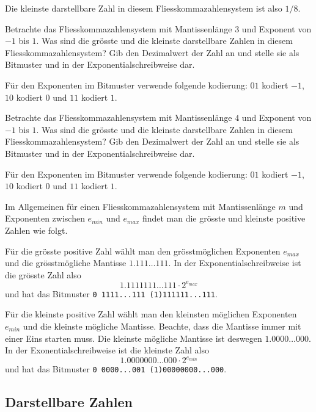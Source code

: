 \begin{beispiel}
Die kleinste darstellbare Zahl in diesem Fliesskommazahlensystem ist also \(1/8\).
\end{beispiel}

\begin{aufgabe}\label{groesste_klein}
Betrachte das Fliesskommazahlensystem mit Mantissenlänge \(3\) und Exponent von \(-1\) bis \(1\). Was sind die grösste und die kleinste darstellbare Zahlen in diesem Fliesskommazahlensystem? Gib den Dezimalwert der Zahl an und stelle sie als Bitmuster und in der Exponentialschreibweise dar.

Für den Exponenten im Bitmuster verwende folgende kodierung: \(01\) kodiert \(-1\), \(10\) kodiert \(0\) und \(11\) kodiert \(1\).
\end{aufgabe}

\begin{aufgabe}
Betrachte das Fliesskommazahlensystem mit Mantissenlänge \(4\) und Exponent von \(-1\) bis \(1\). Was sind die grösste und die kleinste darstellbare Zahlen in diesem Fliesskommazahlensystem? Gib den Dezimalwert der Zahl an und stelle sie als Bitmuster und in der Exponentialschreibweise dar.

Für den Exponenten im Bitmuster verwende folgende kodierung: \(01\) kodiert \(-1\), \(10\) kodiert \(0\) und \(11\) kodiert \(1\).
\end{aufgabe}

Im Allgemeinen für einen Fliesskommazahlensystem mit Mantissenlänge \(m\) und Exponenten zwischen \(e_{min}\) und \(e_{max}\) findet man die grösste und kleinste positive Zahlen wie folgt.

Für die grösste positive Zahl wählt man den grösstmöglichen Exponenten \(e_{max}\) und die grösstmögliche Mantisse \(1.111 \ldots 111\). In der Exponentialschreibweise ist die grösste Zahl also 
\[1.1111111 \ldots 111 \cdot 2^{e_{max}}\]
und hat das Bitmuster \texttt{0 1111...111 (1)111111...111}.

Für die kleinste positive Zahl wählt man den kleinsten möglichen Exponenten \(e_{min}\) und die kleinste mögliche Mantisse. Beachte, dass die Mantisse immer mit einer Eins starten muss. Die kleinste mögliche Mantisse ist deswegen \(1.0000 \ldots 000\). In der Exonentialschreibweise ist die kleinste Zahl also
\[1.0000000 \ldots 000 \cdot 2^{e_{min}}\]
und hat das Bitmuster \texttt{0 0000...001 (1)00000000...000}.


\subsection{Darstellbare Zahlen}

